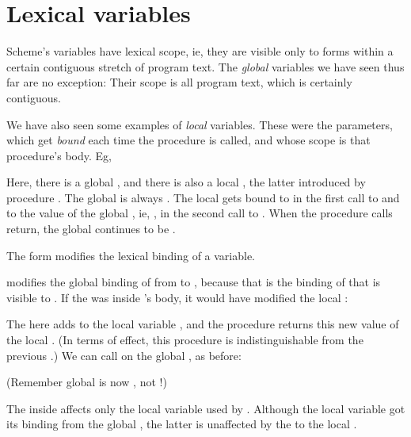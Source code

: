 \chapter{Lexical variables}

Scheme's variables have lexical scope, ie, they are
visible only to forms within a certain contiguous
stretch of program text.  The {\em global} variables we
have seen thus far are no exception: Their scope is all
program text, which is certainly contiguous.

We have also seen some examples of {\em local}
variables.  These were the  parameters, which
get {\em bound} each time the procedure is called, and
whose scope is that procedure's body.  Eg,


Here, there is a global , and there is also a
local , the latter introduced by procedure
.  The global  is always
.  The local  gets bound to  in the
first call to  and to the value of the global
, ie, , in the second call to .
When the procedure calls return, the global 
continues to be .

The form  modifies the lexical binding of a
variable.


\n modifies the global binding of  from  to
, because that is the binding of  that is
visible to .  If the  was inside
's body, it would have modified the local
:


The  here adds  to the local variable
, and the procedure returns this new value of the local .  (In terms of effect,
this procedure is indistinguishable from the previous
.)  We can call  on the
global , as before:


\n (Remember global  is now , not !)

The  inside  affects only the local
variable used by .  Although the local variable
 got its  binding from the global ,
the latter is unaffected by the  to the local
.

